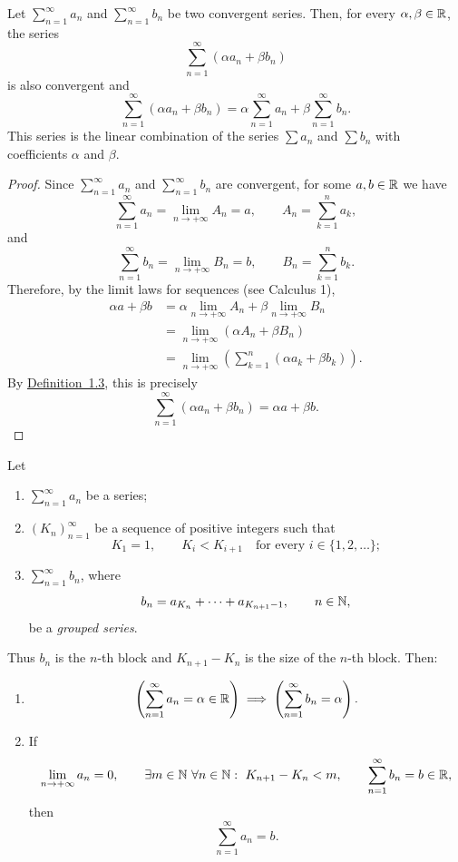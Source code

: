 \begin{claim}\label{claim:1.8}
Let $\sum_{n=1}^{\infty}a_n$ and $\sum_{n=1}^{\infty}b_n$ be two convergent series. Then, for every $\alpha,\beta\in\mathbb{R}$, the series
\[
\sum_{n=1}^{\infty}(\alpha a_n+\beta b_n)
\]
is also convergent and
\[
\sum_{n=1}^{\infty}(\alpha a_n+\beta b_n)
=\alpha\sum_{n=1}^{\infty}a_n
+\beta\sum_{n=1}^{\infty}b_n.
\]
This series is the linear combination of the series $\sum a_n$ and $\sum b_n$ with coefficients $\alpha$ and $\beta$.
\end{claim}

\begin{proof}
Since $\sum_{n=1}^{\infty}a_n$ and $\sum_{n=1}^{\infty}b_n$ are convergent, for some $a,b\in\mathbb{R}$ we have
\[
\sum_{n=1}^{\infty}a_n=\lim_{n\to+\infty}A_n=a,
\qquad
A_n=\sum_{k=1}^{n}a_k,
\]
and
\[
\sum_{n=1}^{\infty}b_n=\lim_{n\to+\infty}B_n=b,
\qquad
B_n=\sum_{k=1}^{n}b_k.
\]
Therefore, by the limit laws for sequences (see Calculus 1),
\begin{align*}
\alpha a+\beta b
&=\alpha\lim_{n\to+\infty}A_n+\beta\lim_{n\to+\infty}B_n\\
&=\lim_{n\to+\infty}(\alpha A_n+\beta B_n)\\
&=\lim_{n\to+\infty}\left(\sum_{k=1}^{n}(\alpha a_k+\beta b_k)\right).
\end{align*}
By \hyperref[def:1.3]{Definition~1.3}, this is precisely
\[
\sum_{n=1}^{\infty}(\alpha a_n+\beta b_n)=\alpha a+\beta b.
\]
\end{proof}

\begin{claim}\label{claim:1.9}
Let
\begin{enumerate}[label=\alph*)]
\item\label{item:claim:1.9:a} $\displaystyle \sum_{n=1}^{\infty}a_n$ be a series;
\item\label{item:claim:1.9:b} $(K_n)_{n=1}^{\infty}$ be a sequence of positive integers such that
\[
K_1=1,
\qquad
K_i<K_{i+1}\quad\text{for every }i\in\{1,2,\ldots\};
\]
\item\label{item:claim:1.9:c} $\displaystyle \sum_{n=1}^{\infty}b_n$, where
\[
b_n=a_{K_n}+\cdots+a_{K_{n+1}-1},
\qquad n\in\mathbb{N},
\]
be a \emph{grouped series}.
\end{enumerate}
Thus $b_n$ is the $n$-th block and $K_{n+1}-K_n$ is the size of the $n$-th block.
Then:
\begin{enumerate}[label=\arabic*)]
\item\label{item:claim:1.9:1}
\[
\left(\sum_{n=1}^{\infty}a_n=\alpha\in\mathbb{R}\right)
\implies
\left(\sum_{n=1}^{\infty}b_n=\alpha\right).
\]
\item\label{item:claim:1.9:2} If
\[
\lim_{n\to+\infty}a_n=0,
\qquad
\exists m\in\mathbb{N}\ \forall n\in\mathbb{N}:\ K_{n+1}-K_n<m,
\qquad
\sum_{n=1}^{\infty}b_n=b\in\mathbb{R},
\]
then
\[
\sum_{n=1}^{\infty}a_n=b.
\]
\end{enumerate}
\end{claim}
